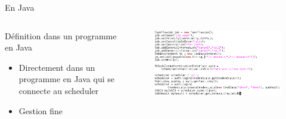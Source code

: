 \documentclass{beamer}
\begin{document}
\begin{frame}{En Java}
	\begin{columns}
	\begin{column}[l]{0.4\linewidth}
        \begin{exampleblock}{Définition dans un programme en Java}
            \begin{itemize}
                \item Directement dans un programme en Java qui se connecte au scheduler
                \item Gestion fine
            \end{itemize}
        \end{exampleblock}
	\end{column}
	\begin{column}[r]{0.6\linewidth}
        \vspace{-1cm}
        \begin{figure}
            \centering
            \includegraphics[scale=0.32]{jobjava.png}
        \end{figure}
	\end{column}
	\end{columns}
    
\end{frame}
\end{document}
